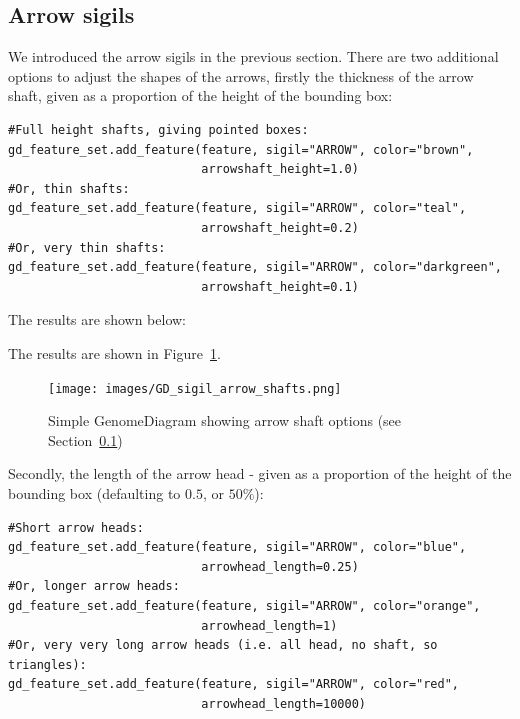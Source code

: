\documentclass{report}
\begin{document}
\subsection{Arrow sigils}
\label{sec:gd_arrow_sigils}

We introduced the arrow sigils in the previous section.
There are two additional options to adjust the shapes of the arrows, firstly
the thickness of the arrow shaft, given as a proportion of the height of the
bounding box:

\begin{verbatim}
#Full height shafts, giving pointed boxes:
gd_feature_set.add_feature(feature, sigil="ARROW", color="brown",
                           arrowshaft_height=1.0)
#Or, thin shafts:                      
gd_feature_set.add_feature(feature, sigil="ARROW", color="teal",
                           arrowshaft_height=0.2)
#Or, very thin shafts:
gd_feature_set.add_feature(feature, sigil="ARROW", color="darkgreen",
                           arrowshaft_height=0.1)
\end{verbatim}

\begin{htmlonly}
\noindent The results are shown below:


\end{htmlonly}
\begin{latexonly}
\noindent The results are shown in Figure~\ref{fig:gd_sigil_arrow_shafts}.
\begin{figure}[htbp]
\centering
\texttt{[image: images/GD\_sigil\_arrow\_shafts.png]}
\caption{Simple GenomeDiagram showing arrow shaft options
(see Section~\ref{sec:gd_arrow_sigils})}
\label{fig:gd_sigil_arrow_shafts}
\end{figure}
\end{latexonly}

Secondly, the length of the arrow head - given as a proportion of the height
of the bounding box (defaulting to $0.5$, or $50\%$):

\begin{verbatim}
#Short arrow heads:
gd_feature_set.add_feature(feature, sigil="ARROW", color="blue",
                           arrowhead_length=0.25)
#Or, longer arrow heads:
gd_feature_set.add_feature(feature, sigil="ARROW", color="orange",
                           arrowhead_length=1)
#Or, very very long arrow heads (i.e. all head, no shaft, so triangles):
gd_feature_set.add_feature(feature, sigil="ARROW", color="red",
                           arrowhead_length=10000)
\end{verbatim}
\end{document}
